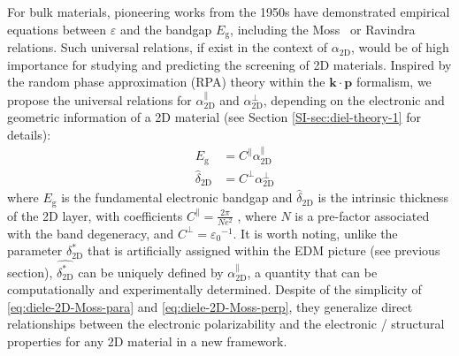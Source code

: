 For bulk materials, pioneering works from the 1950s have demonstrated
empirical equations between $\varepsilon$ and the bandgap
$E_{\mathrm{g}}$, including the
Moss~\cite{Moss_1950_relation,Moss_1985_n_Eg,Finkenrath_1988} or
Ravindra~\cite{Ravindra_1980_model,Ravindra_1979_eps_Eg} relations.
Such universal relations, if exist in the context of
$\alpha_{\mathrm{2D}}$, would be of high importance for studying and
predicting the screening of 2D materials.  Inspired by the random
phase approximation (RPA) theory \cite{Adler_1962_eps} within the
$\mathbf{k} \cdot \mathbf{p}$
formalism\cite{kittel_2005_introduction,Jiang_2017_Eg_Eb}, we propose the universal relations for $\alpha_{\mathrm{2D}}^{\parallel}$ and $\alpha_{\mathrm{2D}}^{\perp}$,
depending on the electronic and geometric information of a 2D material (see
 Section \autoref{SI-sec:diel-theory-1} for details):
\begin{subequations}
\begin{eqnarray}
\label{eq:diele-2D-Moss-para}
  &E_{\mathrm{g}} &= C^{\parallel} \alpha_{\mathrm{2D}}^{\parallel} \\
  \label{eq:diele-2D-Moss-perp}
  &\hat{\delta}_{\mathrm{2D}} & = C^{\perp} \alpha_{\mathrm{2D}}^{\perp} 
\end{eqnarray}
\end{subequations}
where $E_{\mathrm{g}}$ is the fundamental electronic bandgap and
$\hat{\delta}_{\mathrm{2D}}$ is the intrinsic thickness of the 2D
layer, with coefficients
$C^{\parallel} = {\displaystyle \frac{2 \pi}{Ne^2}}$
\cite{Jiang_2017_Eg_Eb}, where $N$ is a pre-factor associated with the
band degeneracy, and $C^{\perp} = {\varepsilon_{0}}^{-1}$. It is worth
noting, unlike the parameter $\delta^{*}_{\mathrm{2D}}$ that is
artificially assigned within the EDM picture (see previous section),
$\hat{\delta^{*}_{\mathrm{2D}}}$ can be uniquely defined by
$\alpha_{\mathrm{2D}}^{\parallel}$, a quantity that can be
computationally and experimentally determined. Despite of the
simplicity of  \autoref{eq:diele-2D-Moss-para} and \autoref{eq:diele-2D-Moss-perp},
they generalize direct relationships between the electronic polarizability and
the electronic / structural properties for any 2D material in a new
framework.

